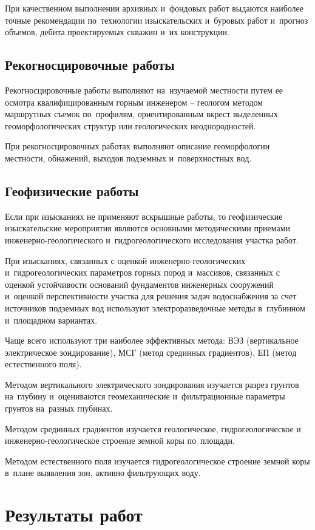 При качественном выполнении архивных и~фондовых работ выдаются наиболее точные рекомендации по~технологии изыскательских и~буровых работ и~прогноз объемов, дебита проектируемых скважин и~их конструкции.

\subsection{Рекогносцировочные работы}
Рекогносцировочные работы выполняют на~изучаемой местности путем ее осмотра квалифицированным горным инженером -- геологом методом маршрутных съемок по~профилям, ориентированным вкрест выделенных геоморфологических структур или геологических неоднородностей.

При рекогносцировочных работах выполняют описание геоморфологии местности, обнажений, выходов подземных и~поверхностных вод.

\subsection{Геофизические работы}
Если при изысканиях не применяют вскрышные работы, то геофизические изыскательские мероприятия являются основными методическими приемами инженерно-геологического и~гидрогеологического исследования участка работ.

При изысканиях, связанных с оценкой инженерно-геологических и~гидрогеологических параметров горных пород и~массивов, связанных с оценкой устойчивости оснований фундаментов инженерных сооружений и~оценкой перспективности участка для решения задач водоснабжения за счет источников подземных вод используют электроразведочные методы в~глубинном и~площадном вариантах.

Чаще всего используют три наиболее эффективных метода:  ВЭЗ (вертикальное электрическое зондирование), МСГ (метод срединных градиентов), ЕП (метод естественного поля).

Методом вертикального электрического зондирования изучается разрез грунтов на~глубину и~оцениваются геомеханические и~фильтрационные параметры грунтов на~разных глубинах.

Методом срединных градиентов изучается геологическое, гидрогеологическое и инженерно-геологическое строение земной коры по~площади.

Методом естественного поля изучается гидрогеологическое строение земной коры в~плане выявления зон, активно фильтрующих воду.

\section{Результаты работ}
